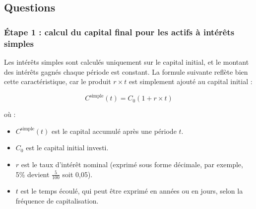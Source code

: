 \documentclass{article}
\begin{document}
\subsection{Questions}
\subsubsection*{Étape 1 : calcul du capital final pour les actifs à intérêts simples}

\begin{tcolorbox}[
        colback=lightgreen, 
        colframe=lightgreen, 
        boxrule=0.5pt, 
        arc=0pt, 
        left=10pt, 
        right=10pt, 
        top=6pt, 
        bottom=6pt, 
        boxsep=2pt, 
        before upper={\faLightbulb\hspace{10pt}}
    ]
    Les intérêts simples sont calculés uniquement sur le capital initial, et le montant des intérêts gagnés chaque période est constant. La formule suivante reflète bien cette caractéristique, car le produit \( r \times t \) est simplement ajouté au capital initial :
    
    \[
        C^{\text{simple}}(t) = C_0 \left(1 + r \times t\right)
    \]
        
    où :
    \begin{itemize}
        \item \( C^{\text{simple}}(t) \) est le capital accumulé après une période \( t \).
        \item \( C_0 \) est le capital initial investi.
        \item \( r \) est le taux d'intérêt nominal (exprimé sous forme décimale, par exemple, 5\% devient $\frac{5}{100}$ soit 0,05).
        \item \( t \) est le temps écoulé, qui peut être exprimé en années ou en jours, selon la fréquence de capitalisation.
    \end{itemize}
\end{tcolorbox}
\end{document}
